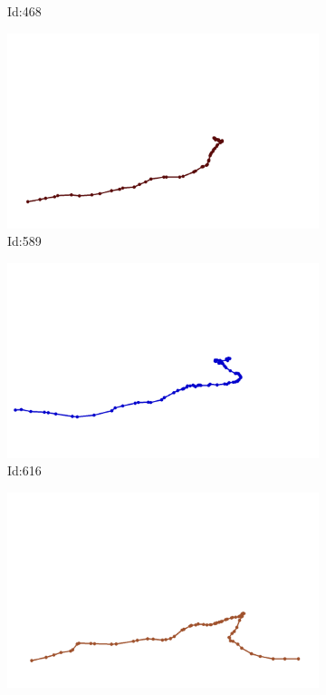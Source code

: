 \documentclass[12pt,twoside]{report}
\begin{document}
\begin{figure}
\begin{subfigure}[b]{0.20\textwidth}
\caption{Id:468}
\end{subfigure}
\begin{subfigure}[b]{0.20\textwidth}
\centering
\includegraphics[width=\textwidth]{../../trajectories/589.png}
\caption{Id:589}
\end{subfigure}
\begin{subfigure}[b]{0.20\textwidth}
\centering
\includegraphics[width=\textwidth]{../../trajectories/616.png}
\caption{Id:616}
\end{subfigure}
\begin{subfigure}[b]{0.20\textwidth}
\centering
\includegraphics[width=\textwidth]{../../trajectories/628.png}

\end{subfigure}
\end{figure}
\end{document}
